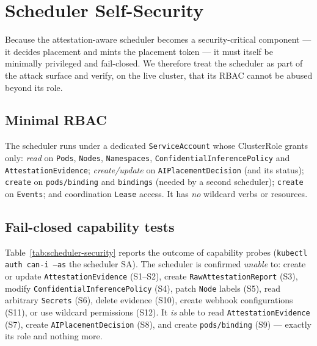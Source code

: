 
\section{Scheduler Self-Security}
\label{sec:scheduler-security}

Because the attestation-aware scheduler becomes a security-critical component ---
it decides placement and mints the placement token --- it must itself be
minimally privileged and fail-closed. We therefore treat the scheduler as part
of the attack surface and verify, on the live cluster, that its RBAC cannot be
abused beyond its role.

\subsection{Minimal RBAC}
The scheduler runs under a dedicated \texttt{ServiceAccount} whose ClusterRole
grants only: \emph{read} on \texttt{Pods}, \texttt{Nodes}, \texttt{Namespaces},
\texttt{ConfidentialInferencePolicy} and \texttt{AttestationEvidence};
\emph{create/update} on \texttt{AIPlacementDecision} (and its status);
\texttt{create} on \texttt{pods/binding} and \texttt{bindings} (needed by a
second scheduler); \texttt{create} on \texttt{Events}; and coordination
\texttt{Lease} access. It has \emph{no} wildcard verbs or resources.

\subsection{Fail-closed capability tests}
Table~\ref{tab:scheduler-security} reports the outcome of capability probes
(\texttt{kubectl auth can-i --as} the scheduler SA). The scheduler is confirmed
\emph{unable} to: create or update \texttt{AttestationEvidence} (S1--S2), create
\texttt{RawAttestationReport} (S3), modify \texttt{ConfidentialInferencePolicy}
(S4), patch \texttt{Node} labels (S5), read arbitrary \texttt{Secrets} (S6),
delete evidence (S10), create webhook configurations (S11), or use wildcard
permissions (S12). It \emph{is} able to read \texttt{AttestationEvidence} (S7),
create \texttt{AIPlacementDecision} (S8), and create \texttt{pods/binding} (S9)
--- exactly its role and nothing more.


